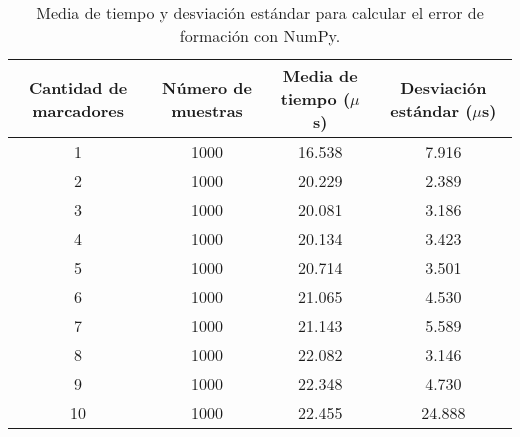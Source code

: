 \begin{table}[H]
	\centering
	\resizebox{\textwidth}{!} {
	\begin{tabular}{|c|c|c|c|}
		\hline
		\textbf{Cantidad de marcadores} & \textbf{Número de muestras} & \textbf{Media de tiempo ($\mu$s)} & \textbf{Desviación estándar ($\mu$s)} \\ \hline
		1                               & 1000                        & 16.538                        & 7.916                             \\ \hline
		2                               & 1000                        & 20.229                        & 2.389                             \\ \hline
		3                               & 1000                        & 20.081                        & 3.186                             \\ \hline
		4                               & 1000                        & 20.134                        & 3.423                             \\ \hline
		5                               & 1000                        & 20.714                        & 3.501                             \\ \hline
		6                               & 1000                        & 21.065                        & 4.530                             \\ \hline
		7                               & 1000                        & 21.143                        & 5.589                             \\ \hline
		8                               & 1000                        & 22.082                        & 3.146                             \\ \hline
		9                               & 1000                        & 22.348                        & 4.730                             \\ \hline
		10                              & 1000                        & 22.455                        & 24.888                            \\ \hline
	\end{tabular}}
	\caption{Media de tiempo y desviación estándar para calcular el error de formación con NumPy.}
	\label{cuadro:tiempos_error_numpy}
\end{table}

